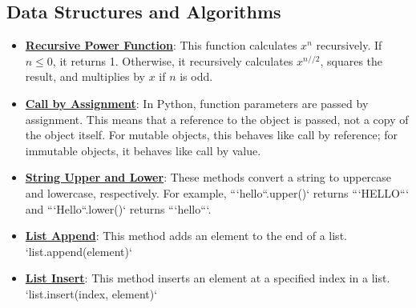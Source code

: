 \documentclass{article}%
\begin{document}
%
\subsection{Data Structures and Algorithms}%
\label{subsec:DataStructuresandAlgorithms}%
\begin{itemize}[leftmargin=*]%
\item \href{https://purdue.brightspace.com/d2l/common/assets/pdfjs-d2l-dist/1.0.14-legacy/web/viewer.html?file=\%2Fcontent\%2Fenforced\%2F1095465-WL.202510.CS24200.LE1\%2F02L1-python.pdf\%3Fou\%3D1095465\&lang=en-us\&container=d2l-fileviewer-rendered-pdf\&fullscreen=d2l-fileviewer-rendered-pdf-dialog\&height=667#page=36}{\textbf{Recursive Power Function}}: This function calculates $x^n$ recursively. If $n \le 0$, it returns 1. Otherwise, it recursively calculates $x^{n//2}$, squares the result, and multiplies by $x$ if $n$ is odd.%
\item \href{https://purdue.brightspace.com/d2l/common/assets/pdfjs-d2l-dist/1.0.14-legacy/web/viewer.html?file=\%2Fcontent\%2Fenforced\%2F1095465-WL.202510.CS24200.LE1\%2F02L1-python.pdf\%3Fou\%3D1095465\&lang=en-us\&container=d2l-fileviewer-rendered-pdf\&fullscreen=d2l-fileviewer-rendered-pdf-dialog\&height=667#page=38}{\textbf{Call by Assignment}}: In Python, function parameters are passed by assignment. This means that a reference to the object is passed, not a copy of the object itself. For mutable objects, this behaves like call by reference; for immutable objects, it behaves like call by value.%
\item \href{https://purdue.brightspace.com/d2l/common/assets/pdfjs-d2l-dist/1.0.14-legacy/web/viewer.html?file=\%2Fcontent\%2Fenforced\%2F1095465-WL.202510.CS24200.LE1\%2F02L1-python.pdf\%3Fou\%3D1095465\&lang=en-us\&container=d2l-fileviewer-rendered-pdf\&fullscreen=d2l-fileviewer-rendered-pdf-dialog\&height=667#page=35}{\textbf{String Upper and Lower}}: These methods convert a string to uppercase and lowercase, respectively. For example, ```hello``.upper()` returns ```HELLO``` and ```Hello``.lower()` returns ```hello```.%
\item \href{https://purdue.brightspace.com/d2l/common/assets/pdfjs-d2l-dist/1.0.14-legacy/web/viewer.html?file=\%2Fcontent\%2Fenforced\%2F1095465-WL.202510.CS24200.LE1\%2F03L1-python.pdf\%3Fou\%3D1095465\&lang=en-us\&container=d2l-fileviewer-rendered-pdf\&fullscreen=d2l-fileviewer-rendered-pdf-dialog\&height=667#page=24}{\textbf{List Append}}: This method adds an element to the end of a list. `list.append(element)`%
\item \href{https://purdue.brightspace.com/d2l/common/assets/pdfjs-d2l-dist/1.0.14-legacy/web/viewer.html?file=\%2Fcontent\%2Fenforced\%2F1095465-WL.202510.CS24200.LE1\%2F03L1-python.pdf\%3Fou\%3D1095465\&lang=en-us\&container=d2l-fileviewer-rendered-pdf\&fullscreen=d2l-fileviewer-rendered-pdf-dialog\&height=667#page=24}{\textbf{List Insert}}: This method inserts an element at a specified index in a list. `list.insert(index, element)`%

\end{itemize}
\end{document}

